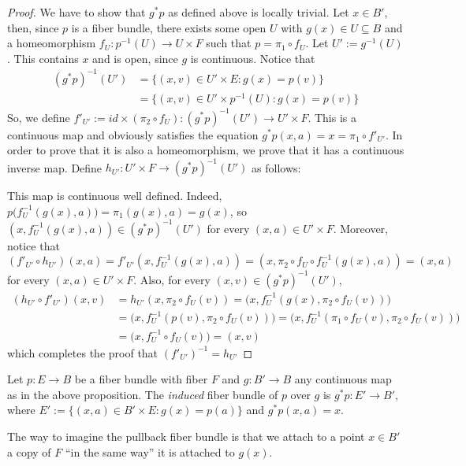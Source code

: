 \begin{proof} We have to show that $g^*p$ as defined above is locally trivial. Let $x\in B'$, then, since $p$ is a fiber bundle, there exists some open $U$ with $g(x)\in U\subseteq B$ and a homeomorphism $f_U:p^{-1}(U)\to U\times F$ such that $p=\pi_1\circ f_U$. Let $U':=g^{-1}(U)$. This contains $x$ and is open, since $g$ is continuous. Notice that
\begin{align*}
(g^*p)^{-1}(U')&=\{(x,v)\in U'\times E: g(x)=p(v)\}\\
&=\{(x,v)\in U'\times p^{-1}(U):g(x)=p(v)\}
\end{align*}
So, we define $f'_{U'}:= id\times(\pi_2\circ f_U):(g^*p)^{-1}(U')\to U'\times F$. This is a continuous map and obviously satisfies the equation $g^*p(x,a)=x=\pi_1\circ f'_{U'}$. In order to prove that it is also a homeomorphism, we prove that it has a continuous inverse map. Define $h_{U'}:U'\times F\to (g^*p)^{-1}(U')$ as follows:
\begin{center}
\end{center}
This map is continuous well defined. Indeed, $p\big(f_U^{-1}(g(x),a)\big)=\pi_1(g(x),a)=g(x)$, so $(x,f_U^{-1}(g(x),a))\in (g^*p)^{-1}(U')$ for every $(x,a)\in U'\times F$. Moreover, notice that $(f'_{U'}\circ h_{U'})(x,a)=f'_{U'}(x,f_U^{-1}(g(x),a))=(x,\pi_2\circ f_U\circ f_U^{-1}(g(x),a))=(x,a)$ for every $(x,a)\in U'\times F$. Also, for every $(x,v)\in (g^*p)^{-1}(U')$,
\begin{align*}
(h_{U'}\circ f'_{U'})(x,v)&=h_{U'}(x,\pi_2\circ f_U(v))=\big(x,f_U^{-1}(g(x),\pi_2\circ f_U(v))\big)\\
&=\big(x,f_U^{-1}(p(v),\pi_2\circ f_U(v))\big)=\big(x,f_U^{-1}(\pi_1\circ f_U(v),\pi_2\circ f_U(v))\big)\\
&=\big(x,f_U^{-1}\circ f_U(v)\big)=(x,v)
\end{align*}
which completes the proof that $(f'_{U'})^{-1}=h_{U'}$
\end{proof}

\begin{definition} Let $p:E\to B$ be a fiber bundle with fiber $F$ and $g:B'\to B$ any continuous map as in the above proposition. The \emph{induced} fiber bundle of $p$ over $g$ is $g^*p:E'\to B'$, where $E':=\{(x,a)\in B'\times E:g(x)=p(a)\}$ and $g^*p(x,a)=x$.
\end{definition}
The way to imagine the pullback fiber bundle is that we attach to a point $x\in B'$ a copy of $F$ ``in the same way'' it is attached to $g(x)$.

